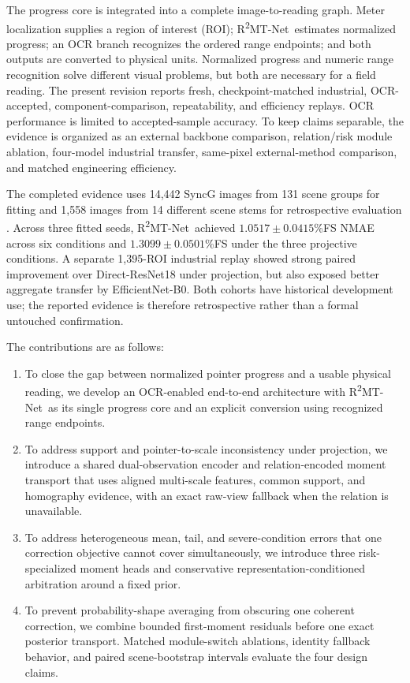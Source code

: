 \documentclass[electronics,article,submit,oneauthor]{Definitions/mdpi}
\newcommand{\modelname}{R\textsuperscript{2}MT-Net}
\begin{document}
The progress core is integrated into a complete image-to-reading graph. Meter localization supplies a region of interest (ROI); \modelname\ estimates normalized progress; an OCR branch recognizes the ordered range endpoints; and both outputs are converted to physical units. Normalized progress and numeric range recognition solve different visual problems, but both are necessary for a field reading. The present revision reports fresh, checkpoint-matched industrial, OCR-accepted, component-comparison, repeatability, and efficiency replays. OCR performance is limited to accepted-sample accuracy. To keep claims separable, the evidence is organized as an external backbone comparison, relation/risk module ablation, four-model industrial transfer, same-pixel external-method comparison, and matched engineering efficiency.

The completed evidence uses 14,442 SyncG images from 131 scene groups for fitting and 1,558 images from 14 different scene stems for retrospective evaluation \cite{deng2026syncg}. Across three fitted seeds, \modelname\ achieved $1.0517\pm0.0415$\%FS NMAE across six conditions and $1.3099\pm0.0501$\%FS under the three projective conditions. A separate 1,395-ROI industrial replay showed strong paired improvement over Direct-ResNet18 under projection, but also exposed better aggregate transfer by EfficientNet-B0. Both cohorts have historical development use; the reported evidence is therefore retrospective rather than a formal untouched confirmation.

The contributions are as follows:
\begin{enumerate}[leftmargin=*]
    \item To close the gap between normalized pointer progress and a usable physical reading, we develop an OCR-enabled end-to-end architecture with \modelname\ as its single progress core and an explicit conversion using recognized range endpoints.
    \item To address support and pointer-to-scale inconsistency under projection, we introduce a shared dual-observation encoder and relation-encoded moment transport that uses aligned multi-scale features, common support, and homography evidence, with an exact raw-view fallback when the relation is unavailable.
    \item To address heterogeneous mean, tail, and severe-condition errors that one correction objective cannot cover simultaneously, we introduce three risk-specialized moment heads and conservative representation-conditioned arbitration around a fixed prior.
    \item To prevent probability-shape averaging from obscuring one coherent correction, we combine bounded first-moment residuals before one exact posterior transport. Matched module-switch ablations, identity fallback behavior, and paired scene-bootstrap intervals evaluate the four design claims.
\end{enumerate}
\end{document}
